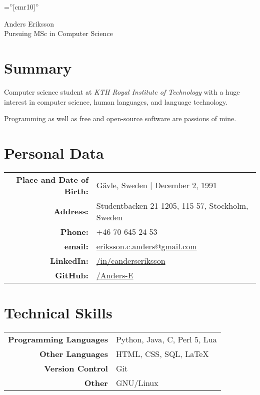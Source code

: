 \documentclass[a4paper,10pt]{article}
\begin{document}
\pagestyle{empty} %

\font\fb=''[cmr10]'' %

\par{
    \centering
	{
	    \Huge \bitter Anders Eriksson \\
	    \normalfont
	    \normalsize Pursuing MSc in Computer Science
	}
	\bigskip\par
}

\section{Summary}
Computer science student at \emph{KTH Royal Institute of Technology} with a huge interest in computer science, human languages, and language technology.

Programming as well as free and open-source software are passions of mine.

\section{Personal Data}

\begin{tabular}{rl}
    \textbf{Place and Date of Birth:} & Gävle, Sweden  | December 2, 1991 \\
    \textbf{Address:}   & Studentbacken 21-1205, 115 57, Stockholm, Sweden \\
    \textbf{Phone:}     & +46 70 645 24 53\\
    \textbf{email:}     & \href{mailto:eriksson.c.anders@gmail.com
}{eriksson.c.anders@gmail.com}\\
    \textbf{LinkedIn:}	& \href{http://se.linkedin.com/in/canderseriksson}{/in/canderseriksson}\\
    \textbf{GitHub:}	& \href{http://github.com/Anders-E}{/Anders-E}
\end{tabular}

\section{Technical Skills}
\begin{tabular}{r|l}
\textbf{Programming Languages} & Python, Java, C, Perl 5, Lua \\
\textbf{Other Languages} & HTML, CSS, SQL, \LaTeX \\
\textbf{Version Control} & Git \\
\textbf{Other} & GNU/Linux\\
\end{tabular}
\end{document}
